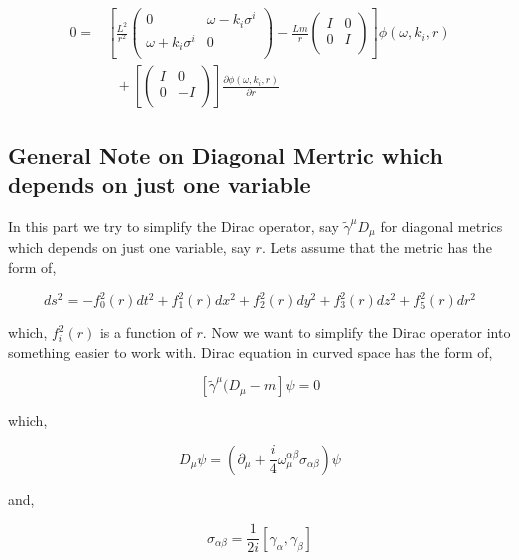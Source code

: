 \begin{align} \label{eq:AdS5spinorequationI}
   0 =& \left[ \frac{L^2}{r^2} \begin{pmatrix} 0 & \omega - k_i\sigma^i \\ \omega + k_i\sigma^i & 0 \\ \end{pmatrix} - \frac{Lm}{r}\begin{pmatrix} I & 0 \\ 0 & I \\ \end{pmatrix} \right] \phi(\omega,k_i,r)\nonumber\\
      & ~~~ + \left[ \begin{pmatrix} I & 0 \\ 0 & -I \\ \end{pmatrix}  \right] \frac{\partial\phi(\omega,k_i,r)}{\partial r}
\end{align}

\subsection{General Note on Diagonal Mertric which depends on just one variable}

In this part we try to simplify the Dirac operator, say $\tilde{\gamma}^\mu D_{\mu}$ for diagonal metrics which depends on just one variable, say $r$. Lets assume that the metric has the form of,

\begin{equation}
   ds^2 = - f_0^2(r) dt^2 + f_1^2(r) dx^2 + f_2^2(r) dy^2 + f_3^2(r) dz^2 + f_5^2(r) dr^2  
\end{equation}

which, $f^2_i(r)$ is a function of $r$. Now we want to simplify the Dirac operator into something easier to work with. Dirac equation in curved space has the form of,

\begin{equation}
   \left[\tilde{\gamma}^{\mu}(D_{\mu} - m\right]\psi = 0
\end{equation}

which,

\begin{equation}
   D_{\mu} \psi = \left(\partial_{\mu} + \frac{i}{4}\omega^{\alpha\beta}_{\mu}\sigma_{\alpha\beta}\right) \psi
\end{equation}

and,

\begin{equation}
   \sigma_{\alpha\beta} = \frac{1}{2i}[\gamma_{\alpha},\gamma_{\beta}]
\end{equation}

